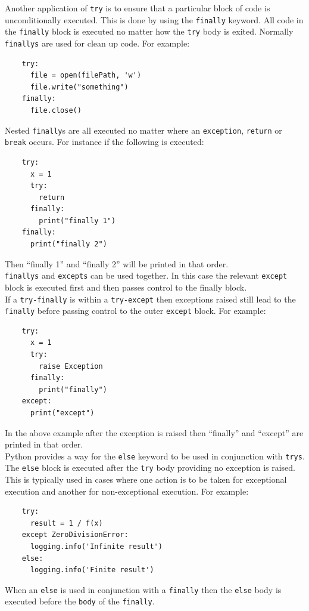 \documentclass[12pt, titlepage]{article}
\begin{document}
\indent Another application of \texttt{try} is to ensure that a particular block of code is unconditionally executed. This is done by using the \texttt{finally} keyword. All code in the \texttt{finally} block is executed no matter how the \texttt{try} body is exited. Normally \texttt{finallys} are used for clean up code. For example:
\begin{lstlisting}
    try:
      file = open(filePath, 'w')
      file.write("something")
    finally:
      file.close()
\end{lstlisting}
\indent Nested \texttt{finally}s are all executed no matter where an \texttt{exception}, \texttt{return} or \texttt{break} occurs. For instance if the following is executed:
\begin{lstlisting}
    try:
      x = 1
      try:
        return
      finally:
        print("finally 1")
    finally:
      print("finally 2")
\end{lstlisting}
Then ``finally 1'' and ``finally 2'' will be printed in that order. \\
\indent \texttt{finallys} and \texttt{excepts} can be used together. In this case the relevant \texttt{except} block is executed first and then passes control to the finally block. \\
\indent If a \texttt{try-finally} is within a \texttt{try-except} then exceptions raised still lead to the \texttt{finally} before passing control to the outer \texttt{except} block. For example:
\begin{lstlisting}
    try:
      x = 1
      try:
        raise Exception
      finally:
        print("finally")
    except:
      print("except")
\end{lstlisting}
In the above example after the exception is raised then ``finally'' and ``except'' are printed in that order. \\
\indent Python provides a way for the \texttt{else} keyword to be used in conjunction with \texttt{trys}. The \texttt{else} block is executed after the \texttt{try} body providing no exception is raised. This is typically used in cases where one action is to be taken for exceptional execution and another for non-exceptional execution. For example:
\begin{lstlisting}
    try:
      result = 1 / f(x)
    except ZeroDivisionError:
      logging.info('Infinite result')
    else:
      logging.info('Finite result')
\end{lstlisting}
When an \texttt{else} is used in conjunction with a \texttt{finally} then the \texttt{else} body is executed before the \texttt{body} of the \texttt{finally}. \\
\end{document}
